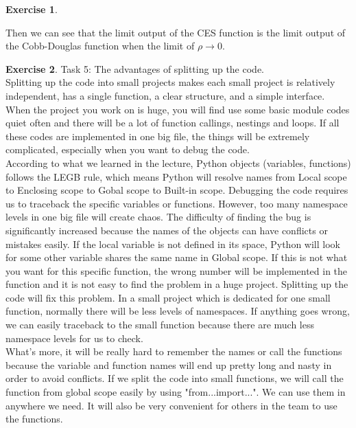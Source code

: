 \documentclass[11pt,a4paper,leqno]{article}
\theoremstyle{definition}
\newtheorem{exercise}{Exercise}
\begin{document}
\begin{exercise}
\begin{enumerate}
        Then we can see that the limit output of the CES function is the limit output of the Cobb-Douglas function when the limit of $\rho \rightarrow 0$.

    \end{enumerate}
\end{exercise}


\begin{exercise}
    Task 5: The advantages of splitting up the code.\\

    Splitting up the code into small projects makes each small project is relatively independent, has a single function, a clear structure, and a simple interface. When the project you work on is huge, you will find use some basic module codes quiet often and there will be a lot of function callings, nestings and loops. If all these codes are implemented in one big file, the things will be extremely complicated, especially when you want to debug the code. \\

    According to what we learned in the lecture, Python objects (variables, functions) follows the LEGB rule, which means Python will resolve names from Local scope to Enclosing scope to Gobal scope to Built-in scope. Debugging the code requires us to traceback the specific variables or functions. However, too many namespace levels in one big file will create chaos. The difficulty of finding the bug is significantly increased because the names of the objects can have conflicts or mistakes easily. If the local variable is not defined in its space, Python will look for some other variable shares the same name in Global scope. If this is not what you want for this specific function, the wrong number will be implemented in the function and it is not easy to find the problem in a huge project. Splitting up the code will fix this problem. In a small project which is dedicated for one small function, normally there will be less levels of namespaces. If anything goes wrong, we can easily traceback to the small function because there are much less namespace levels for us to check. \\

    What's more, it will be really hard to remember the names or call the functions because the variable and function names will end up pretty long and nasty in order to avoid conflicts. If we split the code into small functions, we will call the function from global scope easily by using "from...import...". We can use them in anywhere we need. It will also be very convenient for others in the team to use the functions.\\


\end{exercise}
\end{document}
